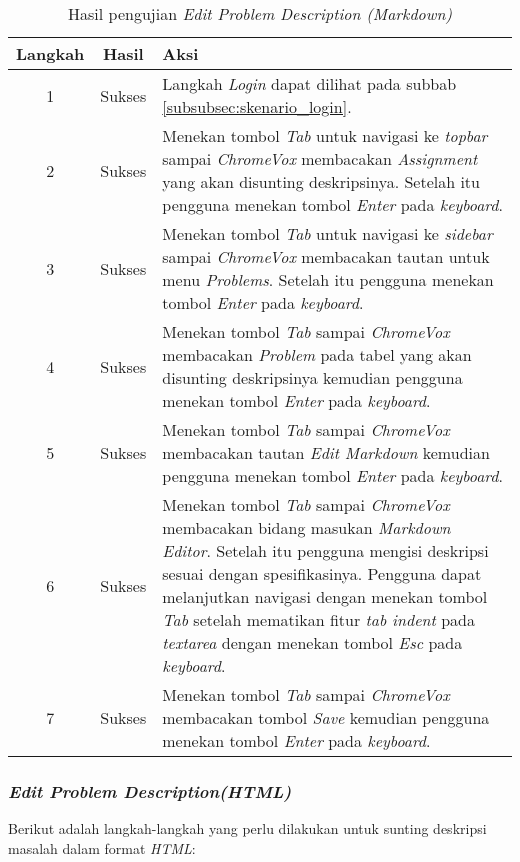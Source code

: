 \begin{table}[H]
	\centering
	\caption{Hasil pengujian \textit{Edit Problem Description (Markdown)}}
	\label{tab:hasil_edit_problem_description_markdown}
	\begin{tabular}{|c|c|p{12cm}|}
		\toprule
		Langkah & Hasil & Aksi\\
		\midrule
		1 & Sukses & Langkah \textit{Login} dapat dilihat pada subbab \ref{subsubsec:skenario_login}.\\
		2 & Sukses & Menekan tombol \textit{Tab} untuk navigasi ke \textit{topbar} sampai \textit{ChromeVox} membacakan \textit{Assignment} yang akan disunting deskripsinya. Setelah itu pengguna menekan tombol \textit{Enter} pada \textit{keyboard}.\\
		3 & Sukses & Menekan tombol \textit{Tab} untuk navigasi ke \textit{sidebar} sampai \textit{ChromeVox} membacakan tautan untuk menu \textit{Problems}. Setelah itu pengguna menekan tombol \textit{Enter} pada \textit{keyboard}.\\
		4 & Sukses & Menekan tombol \textit{Tab} sampai \textit{ChromeVox} membacakan \textit{Problem} pada tabel yang akan disunting deskripsinya kemudian pengguna menekan tombol \textit{Enter} pada \textit{keyboard}.\\
		5 & Sukses & Menekan tombol \textit{Tab} sampai \textit{ChromeVox} membacakan tautan \textit{Edit Markdown} kemudian pengguna menekan tombol \textit{Enter} pada \textit{keyboard}.\\
		6 & Sukses & Menekan tombol \textit{Tab} sampai \textit{ChromeVox} membacakan bidang masukan \textit{Markdown Editor}. Setelah itu pengguna mengisi deskripsi sesuai dengan spesifikasinya. Pengguna dapat melanjutkan navigasi dengan menekan tombol \textit{Tab} setelah mematikan fitur \textit{tab indent} pada \textit{textarea} dengan menekan tombol \textit{Esc} pada \textit{keyboard}.\\
		7 & Sukses & Menekan tombol \textit{Tab} sampai \textit{ChromeVox} membacakan tombol \textit{Save} kemudian pengguna menekan tombol \textit{Enter} pada \textit{keyboard}.\\
		\bottomrule
	\end{tabular}
\end{table}

\subsubsection{\textit{Edit Problem Description(HTML)}}
\label{subsubsec:skenario_edit_problem_description_html}
Berikut adalah langkah-langkah yang perlu dilakukan untuk sunting deskripsi masalah dalam format \textit{HTML}:

